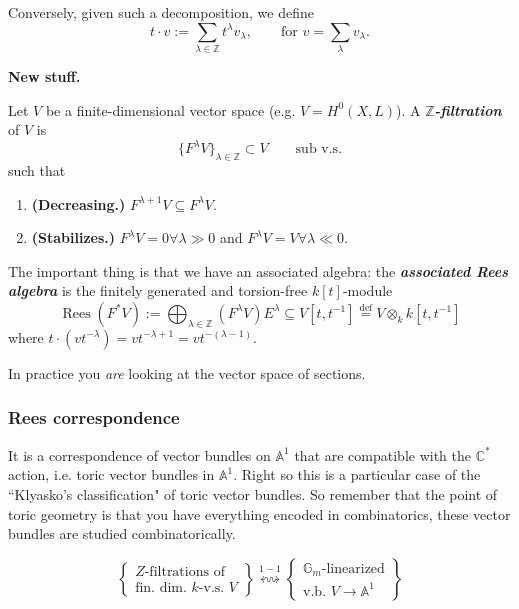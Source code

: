 Conversely, given such a decomposition, we define
\[t\cdot v:= \sum_{\lambda \in \mathbb{Z}}t^\lambda v_\lambda,\qquad \text{for } v = \sum_{\lambda}v_\lambda.\]

\textbf{New stuff.} 

\begin{defn}\leavevmode
Let \(V\) be a finite-dimensional vector space (e.g. \(V= H^{0}(X,L)\)). A \textit{\textbf{\(\mathbb{Z}\)-filtration}} of \(V\) is
\[\{F^\lambda V\}_{\lambda \in \mathbb{Z}}\subset V\qquad \text{sub v.s.} \]
such that
\begin{enumerate}
\item \textbf{(Decreasing.)} \(F^{\lambda +1}V \subseteq F^{\lambda}V\).
\item \textbf{(Stabilizes.)} \(F^\lambda V=0 \forall \lambda \gg 0\) and \(F^{\lambda}V=V \forall  \lambda \ll 0\).
\end{enumerate}
The important thing is that we have an associated algebra: the \textit{\textbf{associated Rees algebra}} is the finitely generated and torsion-free \(k[t]\)-module
\[\operatorname{ R e e s}(F^* V):=\bigoplus_{\lambda \in \mathbb{Z}}(F^\lambda V) E^\lambda \subseteq V[t,t^{-1}] \overset{\operatorname{def}}{=} V \otimes_k k[t,t^{-1}]\]
where \(t \cdot (vt^{-\lambda})=v t ^{- \lambda +1}= vt^{-(\lambda-1)}\).
\end{defn}

\begin{remark}\leavevmode
In practice you \textit{are} looking at the vector space of sections.
\end{remark}

\subsubsection{Rees correspondence}

It is a correspondence of vector bundles on \(\mathbb{A}^1\) that are compatible with the \(\mathbb{C}^*\) action, i.e. toric vector bundles in \(\mathbb{A}^1\). Right so this is a particular case of the ``Klyasko's classification" of toric vector bundles. So remember that the point of toric geometry is that you have everything encoded in combinatorics, these vector bundles are studied combinatorically.

\[\left\{ \substack{\text{\(Z\)-filtrations of}  \\ \text{fin. dim. \(k\)-v.s. \(V\)} } \right\} \overset{1-1}{\leftrightsquigarrow}\left\{ \substack{\mathbb{G}_m \text{-linearized}  \\ \text{v.b. \(V \to \mathbb{A}^1\)} } \right\} \]

